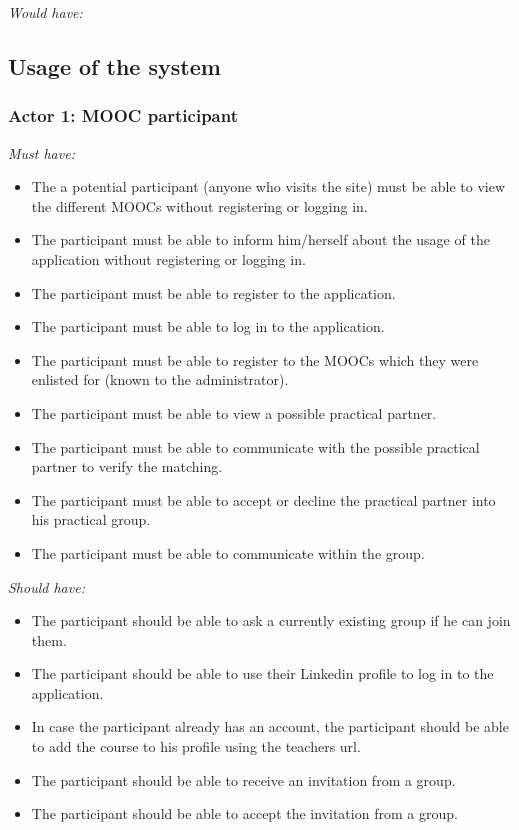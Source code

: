 \documentclass[]{article}
\newcommand{\reqr}[1]{{\noindent\emph{#1:}}}
\begin{document}
\reqr{Would have}

\subsection{Usage of the system}

\subsubsection{Actor 1: MOOC participant}

\reqr{Must have}
\begin{itemize}
\item The a potential participant (anyone who visits the site) must be able to view the different MOOCs without registering or logging in.
\item The participant must be able to inform him/herself about the usage of the application without registering or logging in.
\item The participant must be able to register to the application.
\item The participant must be able to log in to the application.
\item The participant must be able to register to the MOOCs which they were enlisted for (known to the administrator).
\item The participant must be able to view a possible practical partner.
\item The participant must be able to communicate with the possible practical partner to verify the matching.
\item The participant must be able to accept or decline the practical partner into his practical group.
\item The participant must be able to communicate within the group.
\end{itemize}

\reqr{Should have}
\begin{itemize}
\item The participant should be able to ask a currently existing group if he can join them.
\item The participant should be able to use their Linkedin profile to log in to the application.
\item In case the participant already has an account, the participant should be able to add the course to his profile using the teachers url.
\item The participant should be able to receive an invitation from a group.
\item The participant should be able to accept the invitation from a group.
\end{itemize}
\end{document}
